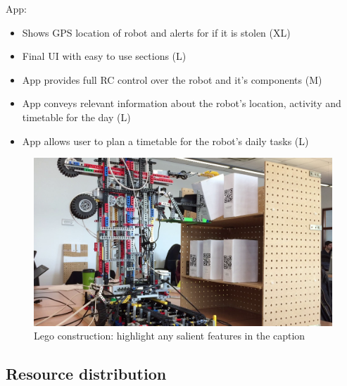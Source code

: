 \documentclass{article}
\begin{document}
App:
\begin{itemize}
\item Shows GPS location of robot and alerts for if it is stolen (XL)
\item Final UI with easy to use sections (L)
\item App provides full RC control over the robot and it's components (M)
\item App conveys relevant information about the robot's location, activity and timetable for the day (L)
\item App allows user to plan a timetable for the robot's daily tasks (L)
\end{itemize}
    


\begin{figure}[tb]
\vskip 5mm
\begin{center}
\centerline{\includegraphics[width=\columnwidth]{figs/crane}}
\caption{Lego construction: highlight any salient features in the caption}
\label{fig:sample-fig}
\end{center}
\vskip -5mm
\end{figure} 


\subsection{Resource distribution}
\end{document}
